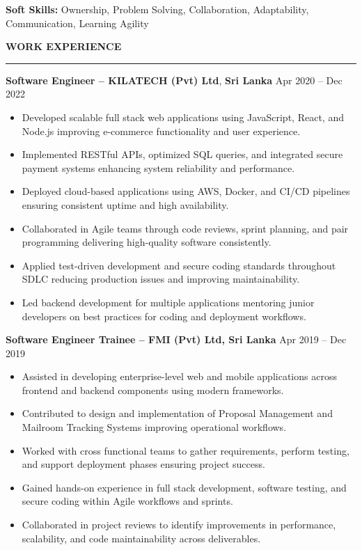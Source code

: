 \documentclass[10pt,letterpaper]{article}
\begin{document}
\textbf{Soft Skills:} Ownership, Problem Solving, Collaboration, Adaptability, Communication, Learning Agility

\vspace{8pt}

\textbf{WORK EXPERIENCE}\\[-8pt]
\noindent\rule{\textwidth}{1pt}

\vspace{-2pt}

\textbf{Software Engineer -- KILATECH (Pvt) Ltd}, \textbf{Sri Lanka} \hfill Apr 2020 -- Dec 2022

\vspace{-1pt}

\begin{itemize}
\item Developed scalable full stack web applications using JavaScript, React, and Node.js improving e-commerce functionality and user experience.
\item Implemented RESTful APIs, optimized SQL queries, and integrated secure payment systems enhancing system reliability and performance.
\item Deployed cloud-based applications using AWS, Docker, and CI/CD pipelines ensuring consistent uptime and high availability.
\item Collaborated in Agile teams through code reviews, sprint planning, and pair programming delivering high-quality software consistently.
\item Applied test-driven development and secure coding standards throughout SDLC reducing production issues and improving maintainability.
\item Led backend development for multiple applications mentoring junior developers on best practices for coding and deployment workflows.
\end{itemize}

\textbf{Software Engineer Trainee -- FMI (Pvt) Ltd, Sri Lanka} \hfill Apr 2019 -- Dec 2019

\vspace{-1pt}

\begin{itemize}
\item Assisted in developing enterprise-level web and mobile applications across frontend and backend components using modern frameworks.
\item Contributed to design and implementation of Proposal Management and Mailroom Tracking Systems improving operational workflows.
\item Worked with cross functional teams to gather requirements, perform testing, and support deployment phases ensuring project success.
\item Gained hands-on experience in full stack development, software testing, and secure coding within Agile workflows and sprints.
\item Collaborated in project reviews to identify improvements in performance, scalability, and code maintainability across deliverables.
\end{itemize}
\end{document}

